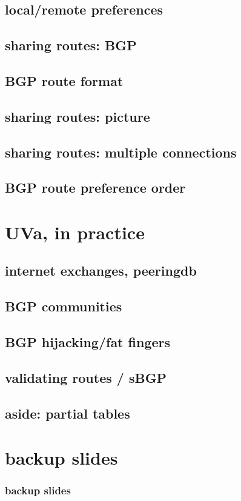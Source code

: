 \subsection{local/remote preferences}


\subsection{sharing routes: BGP}


\subsection{BGP route format}


\subsection{sharing routes: picture}


\subsection{sharing routes: multiple connections}


\subsection{BGP route preference order}

\section{UVa, in practice}


\subsection{internet exchanges, peeringdb}


\subsection{BGP communities}


\subsection{BGP hijacking/fat fingers}


\subsection{validating routes / sBGP}



\subsection{aside: partial tables}



\section{backup slides}
\begin{frame}\frametitle{backup slides}
\end{frame}



